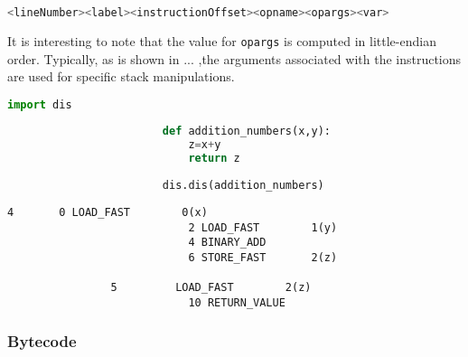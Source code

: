 {			\small
			\begin{lstlisting}[language=bash, caption= Dissasembled instruction convention,numbers=none]
				<lineNumber><label><instructionOffset><opname><opargs><var>
			\end{lstlisting}
			\normalsize

			It is interesting to note that the value for \lstinline|opargs| is computed in little-endian order. Typically, as is shown in ... ,the arguments associated with the instructions are used for 
			specific stack manipulations. 

				
				\begin{lstlisting}[language=Python,caption=Python source code,label=lst:addnossource]
				        import dis
				        
				        def addition_numbers(x,y):
				            z=x+y
				            return z
				       
				        dis.dis(addition_numbers)
				\end{lstlisting}

				\begin{lstlisting}[numbers=none, caption=Disassembly of Listing \ref{lst:addnossource}]
				4    	0 LOAD_FAST        0(x)
							2 LOAD_FAST        1(y)
							4 BINARY_ADD
							6 STORE_FAST       2(z)
				
				5		  LOAD_FAST        2(z)
							10 RETURN_VALUE
				\end{lstlisting}\label{lst:dis_example}

			\subsubsection*{Bytecode}
			\label{subsubsec:bytecode}
			
}
